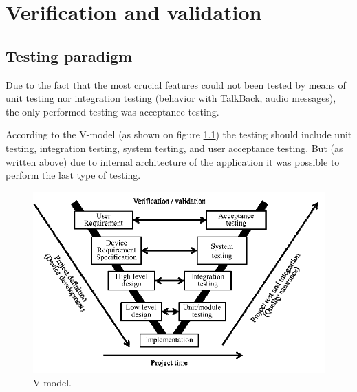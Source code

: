 \documentclass[a4paper,twoside,12pt]{book}
\begin{document}
\chapter{Verification and validation}

\section{Testing paradigm}

\par Due to the fact that the most crucial features could not been tested by means of unit testing nor integration testing (behavior with TalkBack, audio messages), the only performed testing was acceptance testing.
\par According to the V-model (as shown on figure \ref{fig:model}\cite{inproceedings}) the testing should include unit testing, integration testing, system testing, and user acceptance testing. But (as written above) due to internal architecture of the application it was possible to perform the last type of testing.

\begin{figure}[H]
\centering
  \includegraphics[width=.8\linewidth]{V-model.png}
  \caption{V-model.}
  \label{fig:model}
\end{figure}
\end{document}
